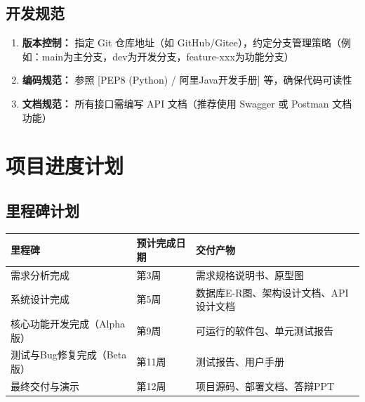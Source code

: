 \documentclass[12pt]{ctexart}
\begin{document}
\subsection{开发规范}
\begin{enumerate}
    \item \textbf{版本控制：} 指定 Git 仓库地址（如 GitHub/Gitee），约定分支管理策略（例如：main为主分支，dev为开发分支，feature-xxx为功能分支）
    \item \textbf{编码规范：} 参照 [PEP8 (Python) / 阿里Java开发手册] 等，确保代码可读性
    \item \textbf{文档规范：} 所有接口需编写 API 文档（推荐使用 Swagger 或 Postman 文档功能）
\end{enumerate}

\section{项目进度计划}

\subsection{里程碑计划}
\begin{center}
\begin{tabular}{|p{4cm}|p{3cm}|p{4cm}|}
\hline
\textbf{里程碑} & \textbf{预计完成日期} & \textbf{交付产物} \\
\hline
需求分析完成 & 第3周 & 需求规格说明书、原型图 \\
\hline
系统设计完成 & 第5周 & 数据库E-R图、架构设计文档、API设计文档 \\
\hline
核心功能开发完成（Alpha版） & 第9周 & 可运行的软件包、单元测试报告 \\
\hline
测试与Bug修复完成（Beta版） & 第11周 & 测试报告、用户手册 \\
\hline
最终交付与演示 & 第12周 & 项目源码、部署文档、答辩PPT \\
\hline
\end{tabular}
\end{center}

\end{document}
